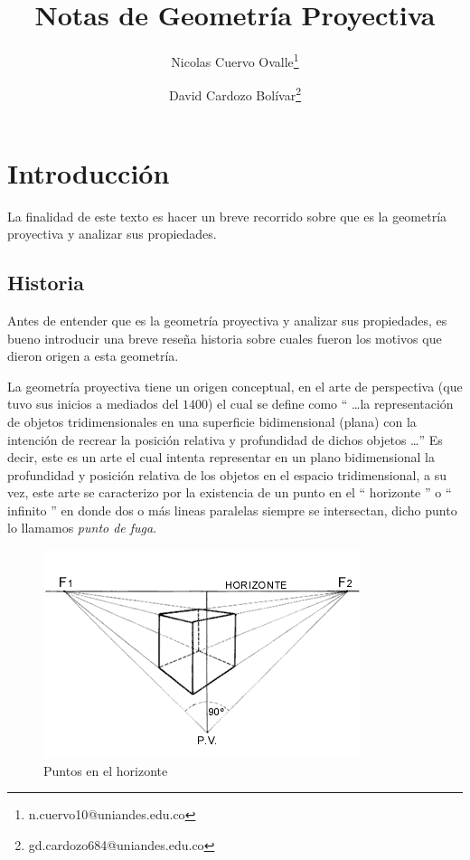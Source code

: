 \documentclass[10pt,a4paper]{article}
\title{Notas de Geometría Proyectiva}
\author[1]{Nicolas Cuervo Ovalle\thanks{n.cuervo10@uniandes.edu.co}}
\author[2]{David Cardozo Bolívar\thanks{gd.cardozo684@uniandes.edu.co}}
\affil[1]{Departamento Matematicas, Universidad de los Andes}
\affil[2]{Departmento Física, Universidad de los Andes}
\begin{document}
\maketitle
\section{Introducción}

La finalidad de este texto es hacer un breve recorrido sobre que es la geometría proyectiva y analizar sus propiedades.
\subsection{Historia}

Antes de entender que es la geometría proyectiva y analizar sus propiedades, es bueno introducir una breve reseña historia sobre cuales fueron los motivos que dieron origen a esta geometría. 

La geometría proyectiva tiene un origen conceptual, en el arte de perspectiva (que tuvo sus inicios a mediados del $1400$) el cual se define como `` \ldots la representación de objetos tridimensionales en una superficie bidimensional (plana) con la intención de recrear la posición relativa y profundidad de dichos objetos \ldots '' Es decir, este es un arte el cual intenta representar en un plano bidimensional la profundidad y posición relativa de los objetos en el espacio tridimensional, a su vez, este arte se caracterizo por la existencia de un punto en el `` horizonte '' o `` infinito '' en donde dos o más lineas paralelas siempre se intersectan, dicho punto lo llamamos \textit{punto de fuga}. 

\begin{figure}[h!]
    \centering
    \includegraphics[scale=0.5]{imagen1.png}
    \caption{Puntos en el horizonte}
\end{figure}
\end{document}
